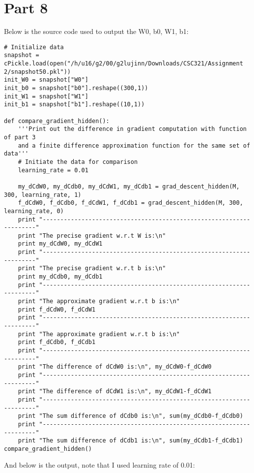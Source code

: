 \documentclass{article}
\begin{document}
\section*{Part 8}
Below is the source code used to output the W0, b0, W1, b1:\\
\begin{lstlisting}
# Initialize data
snapshot = cPickle.load(open("/h/u16/g2/00/g2lujinn/Downloads/CSC321/Assignment 2/snapshot50.pkl"))
init_W0 = snapshot["W0"]
init_b0 = snapshot["b0"].reshape((300,1))
init_W1 = snapshot["W1"]
init_b1 = snapshot["b1"].reshape((10,1))

def compare_gradient_hidden():
    '''Print out the difference in gradient computation with function of part 3 
    and a finite difference approximation function for the same set of data'''
    # Initiate the data for comparison
    learning_rate = 0.01

    my_dCdW0, my_dCdb0, my_dCdW1, my_dCdb1 = grad_descent_hidden(M, 300, learning_rate, 1)
    f_dCdW0, f_dCdb0, f_dCdW1, f_dCdb1 = grad_descent_hidden(M, 300, learning_rate, 0)
    print "--------------------------------------------------------------------"
    print "The precise gradient w.r.t W is:\n"
    print my_dCdW0, my_dCdW1
    print "--------------------------------------------------------------------"
    print "The precise gradient w.r.t b is:\n"
    print my_dCdb0, my_dCdb1
    print "--------------------------------------------------------------------"
    print "The approximate gradient w.r.t b is:\n"
    print f_dCdW0, f_dCdW1
    print "--------------------------------------------------------------------"
    print "The approximate gradient w.r.t b is:\n"
    print f_dCdb0, f_dCdb1
    print "--------------------------------------------------------------------"
    print "The difference of dCdW0 is:\n", my_dCdW0-f_dCdW0
    print "--------------------------------------------------------------------"
    print "The difference of dCdW1 is:\n", my_dCdW1-f_dCdW1
    print "--------------------------------------------------------------------"
    print "The sum difference of dCdb0 is:\n", sum(my_dCdb0-f_dCdb0)
    print "--------------------------------------------------------------------"
    print "The sum difference of dCdb1 is:\n", sum(my_dCdb1-f_dCdb1)
compare_gradient_hidden() 
\end{lstlisting}
And below is the output, note that I used learning rate of 0.01:
\end{document}
